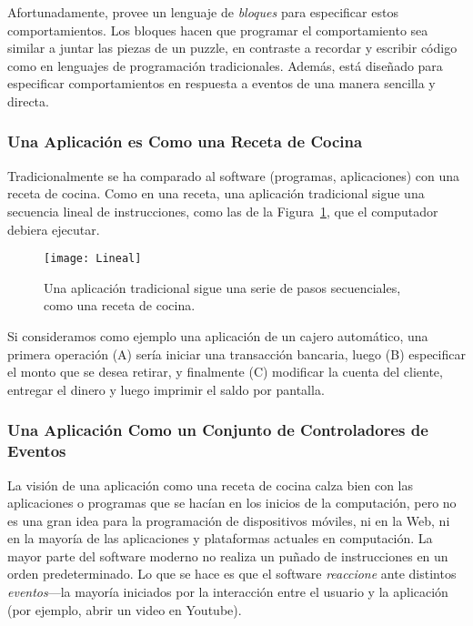 Afortunadamente, \AppInventor provee un lenguaje de \emph{bloques} para especificar estos comportamientos. Los bloques hacen que programar el comportamiento sea similar a juntar las piezas de un puzzle, en contraste a recordar y escribir código como en lenguajes de programación tradicionales. Además, \AppInventor está diseñado para especificar comportamientos en respuesta a eventos de una manera sencilla y directa.

\subsubsection*{Una Aplicación es Como una Receta de Cocina}

Tradicionalmente se ha comparado al software (programas, aplicaciones) con una receta de cocina. Como en una receta, una aplicación tradicional sigue una secuencia lineal de instrucciones, como las de la Figura~\ref{fig:lineal}, que el computador debiera ejecutar.

\begin{figure}[H]
  \centering
  \texttt{[image: Lineal]}
  \caption{Una aplicación tradicional sigue una serie de pasos secuenciales, como una receta de cocina.}
  \label{fig:lineal}
\end{figure}

Si consideramos como ejemplo una aplicación de un cajero automático, una primera operación (A) sería iniciar una transacción bancaria, luego (B) especificar el monto que se desea retirar, y finalmente (C) modificar la cuenta del cliente, entregar el dinero y luego imprimir el saldo por pantalla.

\subsubsection*{Una Aplicación Como un Conjunto de Controladores de
  Eventos}

La visión de una aplicación como una receta de cocina calza bien con las aplicaciones o programas que se hacían en los inicios de la computación, pero no es una gran idea para la programación de dispositivos móviles, ni en la Web, ni en la mayoría de las aplicaciones y plataformas actuales en computación. La mayor parte del software moderno no realiza un puñado de instrucciones en un orden predeterminado. Lo que se hace es que el software \emph{reaccione} ante distintos \emph{eventos}---la mayoría iniciados por la interacción entre el usuario y la aplicación (por ejemplo, abrir un video en Youtube).


